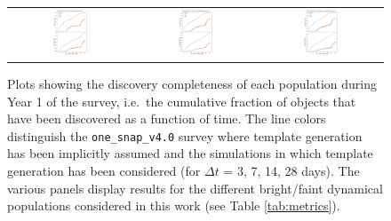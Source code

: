 \documentclass[preprintm,linenumbers]{aastex631}
\newcommand{\baseline}{\texttt{one\_snap\_v4.0}\xspace}
\begin{document}
\begin{figure}
\begin{tabular}{c c c}
				\includegraphics[width=0.3\textwidth]{results/DiscoveryTime_TNO_first_year_one_snap_v4_0_10yrs_db_n_visits_4_noDD_noTwi.pdf} &
				\includegraphics[width=0.3\textwidth]{results/DiscoveryTime_OCC_r5_first_year_one_snap_v4_0_10yrs_db_n_visits_4_noDD_noTwi.pdf} &
				\includegraphics[width=0.3\textwidth]{results/DiscoveryTime_OCC_r20_first_year_one_snap_v4_0_10yrs_db_n_visits_4_noDD_noTwi.pdf} \\
			\end{tabular}
			\caption{Plots showing the discovery completeness of each population during Year 1 of the survey, i.e.\ the cumulative fraction of objects that have been discovered as a function of time.
				The line colors distinguish the \baseline survey where template generation has been implicitly assumed and the simulations in which template generation has been considered (for $\Delta t$ = 3, 7, 14, 28 days).
				The various panels display results for the different bright/faint dynamical populations considered in this work (see Table \ref{tab:metrics}).
			}
			\label{fig:completeness_over_time}
		\end{figure}
		
\end{document}
